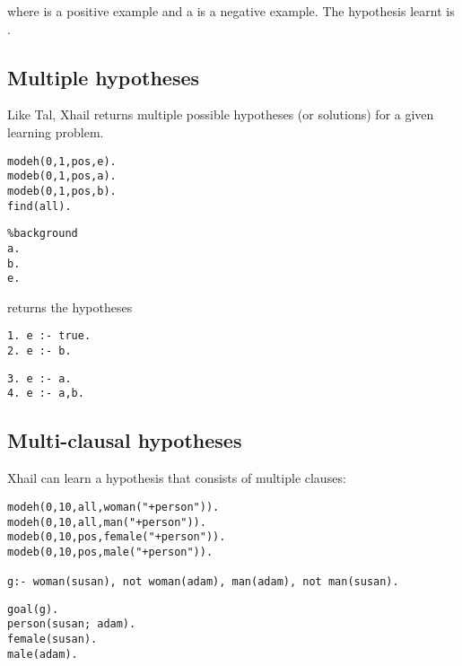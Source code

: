 where  is a positive example and a  is a negative example. The hypothesis learnt is
.

\subsection{Multiple hypotheses}
Like Tal, Xhail returns multiple possible hypotheses (or solutions) for a given learning problem.

\begin{minipage}[t]{.50\textwidth}
\begin{lstlisting}
modeh(0,1,pos,e).
modeb(0,1,pos,a).
modeb(0,1,pos,b).
find(all).
\end{lstlisting}
\end{minipage}
\begin{minipage}[t]{.20\textwidth}
\begin{lstlisting}
%background
a.
b.
e.
\end{lstlisting}
\end{minipage}

returns the hypotheses

\begin{minipage}[t]{.25\textwidth}
\begin{lstlisting}
1. e :- true.
2. e :- b.
\end{lstlisting}
\end{minipage}
\begin{minipage}[t]{.20\textwidth}
\begin{lstlisting}
3. e :- a.
4. e :- a,b.
\end{lstlisting}
\end{minipage}

\subsection{Multi-clausal hypotheses}
Xhail can learn a hypothesis that consists of multiple clauses:

\begin{minipage}[t]{.50\textwidth}
\begin{lstlisting}
modeh(0,10,all,woman("+person")).
modeh(0,10,all,man("+person")).
modeb(0,10,pos,female("+person")).
modeb(0,10,pos,male("+person")).

g:- woman(susan), not woman(adam), man(adam), not man(susan).
\end{lstlisting}
\end{minipage}
\begin{minipage}[t]{.20\textwidth}
\begin{lstlisting}
goal(g).
person(susan; adam).
female(susan).
male(adam).
\end{lstlisting}
\end{minipage}

